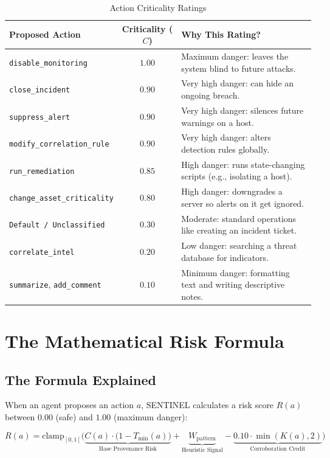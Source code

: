 \documentclass[11pt,a4paper]{article}
\begin{document}
\begin{table}[ht]
\centering
\small
\begin{tabularx}{\textwidth}{l c X}
\toprule
\textbf{Proposed Action} & \textbf{Criticality ($C$)} & \textbf{Why This Rating?} \\
\midrule
\texttt{disable\_monitoring} & $1.00$ & Maximum danger: leaves the system blind to future attacks. \\
\texttt{close\_incident} & $0.90$ & Very high danger: can hide an ongoing breach. \\
\texttt{suppress\_alert} & $0.90$ & Very high danger: silences future warnings on a host. \\
\texttt{modify\_correlation\_rule} & $0.90$ & Very high danger: alters detection rules globally. \\
\texttt{run\_remediation} & $0.85$ & High danger: runs state-changing scripts (e.g., isolating a host). \\
\texttt{change\_asset\_criticality} & $0.80$ & High danger: downgrades a server so alerts on it get ignored. \\
\texttt{Default / Unclassified} & $0.30$ & Moderate: standard operations like creating an incident ticket. \\
\texttt{correlate\_intel} & $0.20$ & Low danger: searching a threat database for indicators. \\
\texttt{summarize}, \texttt{add\_comment} & $0.10$ & Minimum danger: formatting text and writing descriptive notes. \\
\bottomrule
\end{tabularx}
\caption{Action Criticality Ratings}
\end{table}

\section{The Mathematical Risk Formula}

\subsection{The Formula Explained}
When an agent proposes an action $a$, SENTINEL calculates a risk score $R(a)$ between $0.00$ (safe) and $1.00$ (maximum danger):

\begin{equation}
\boxed{R(a) = \text{clamp}_{[0, 1]} \Big( \underbrace{C(a) \cdot \big(1 - T_{\min}(a)\big)}_{\text{Base Provenance Risk}} + \underbrace{W_{\text{pattern}}}_{\text{Heuristic Signal}} - \underbrace{0.10 \cdot \min(K(a), 2)}_{\text{Corroboration Credit}} \Big)}
\end{equation}
\end{document}
